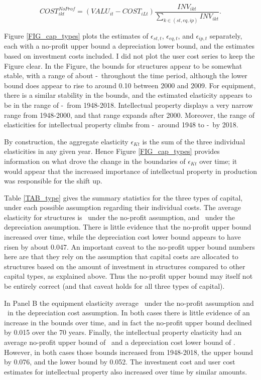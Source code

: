 \documentclass[11pt]{article}
\begin{document}
\begin{equation}
    COST_{ikt}^{NoProf} = \left(VALU_{it} - COST_{iLt}\right)\frac{INV_{ikt}}{\sum_{k \in (st,eq,ip)} INV_{ikt}}.
\end{equation}

Figure \ref{FIG_cap_types} plots the estimates of $\epsilon_{st,t}$, $\epsilon_{eq,t}$, and $\epsilon_{ip,t}$ separately, each with a no-profit upper bound a depreciation lower bound, and the estimates based on investment costs included. I did not plot the user cost series to keep the Figure clear. In the Figure, the bounds for structures appear to be somewhat stable, with a range of about \basestdepr-\basetnoprofit \ throughout the time period, although the lower bound does appear to rise to around 0.10 between 2000 and 2009. For equipment, there is a similar stability in the bounds, and the estimated elasticity appears to be in the range of \baseeqdepr-\baseeqnoprofit \ from 1948-2018. Intellectual property displays a very narrow range from 1948-2000, and that range expands after 2000. Moreover, the range of elasticities for intellectual property climbs from \baseipearlydepr-\baseipearlynoprofit \ around 1948 to \baseiplatedepr-\baseiplatenoprofit \ by 2018.

By construction, the aggregate elasticity $\epsilon_{Kt}$ is the sum of the three individual elasticities in any given year. Hence Figure \ref{FIG_cap_types} provides information on what drove the change in the boundaries of $\epsilon_{Kt}$ over time; it would appear that the increased importance of intellectual property in production was responsible for the shift up.

Table \ref{TAB_type} gives the summary statistics for the three types of capital, under each possible assumption regarding their individual costs. The average elasticity for structures is \basetnoprofit \ under the no-profit assumption, and \basestdepr \ under the depreciation assumption. There is little evidence that the no-profit upper bound increased over time, while the depreciation cost lower bound appears to have risen by about 0.047. An important caveat to the no-profit upper bound numbers here are that they rely on the assumption that capital costs are allocated to structures based on the amount of investment in structures compared to other capital types, as explained above. Thus the no-profit upper bound may itself not be entirely correct (and that caveat holds for all three types of capital).

In Panel B the equipment elasticity average \baseeqnoprofit \ under the no-profit assumption and \baseeqdepr \ in the depreciation cost assumption. In both cases there is little evidence of an increase in the bounds over time, and in fact the no-profit upper bound declined by 0.015 over the 70 years. Finally, the intellectual property elasticity had an average no-profit upper bound of \baseipnoprofit \ and a depreciation cost lower bound of \baseipdepr. However, in both cases those bounds increased from 1948-2018, the upper bound by 0.076, and the lower bound by 0.052. The investment cost and user cost estimates for intellectual property also increased over time by similar amounts. 
\end{document}
